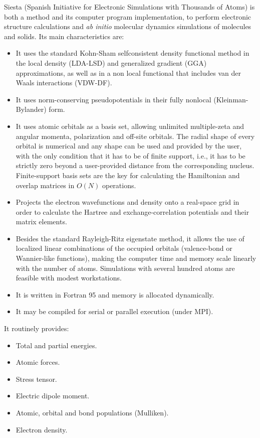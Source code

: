 \documentclass[11pt]{article}
\begin{document}
{\sc Siesta} (Spanish Initiative for
Electronic Simulations with
Thousands of Atoms) is both a method and its computer program implementation,
to perform electronic structure calculations and {\it ab initio} molecular
dynamics simulations of molecules and solids. Its main characteristics are:
\begin{itemize}
\item
It uses the standard Kohn-Sham selfconsistent density functional
method in the local density (LDA-LSD) and generalized gradient (GGA)
approximations, as well as in a non local functional that includes
van der Waals interactions (VDW-DF).
\item
It uses norm-conserving pseudopotentials in their fully nonlocal
(Kleinman-Bylander) form.
\item
It uses atomic orbitals as a basis set, allowing unlimited multiple-zeta
and angular momenta, polarization and off-site orbitals. The radial
shape of every orbital is numerical and any shape can be used and provided
by the user, with the only condition that it has to be of finite support,
i.e., it has to be strictly zero beyond a user-provided distance from the
corresponding nucleus.
Finite-support basis sets are the key for calculating the Hamiltonian
and overlap matrices in $O(N)$ operations.
\item
Projects the electron wavefunctions and density onto a real-space
grid in order to calculate the Hartree and exchange-correlation
potentials and their matrix elements.
\item
Besides the standard Rayleigh-Ritz eigenstate method, it allows
the use of localized linear combinations of the occupied orbitals
(valence-bond or Wannier-like functions), making the computer
time and memory scale linearly with the number of atoms.
Simulations with several hundred atoms are feasible with
modest workstations.
\item
It is written in Fortran 95 and memory is allocated dynamically.
\item
It may be compiled for serial or parallel execution (under MPI).

\end{itemize}

It routinely provides:
\begin{itemize}
\item Total and partial energies.
\item Atomic forces.
\item Stress tensor.
\item Electric dipole moment.
\item Atomic, orbital and bond populations (Mulliken).
\item Electron density.
\end{itemize}
\end{document}
